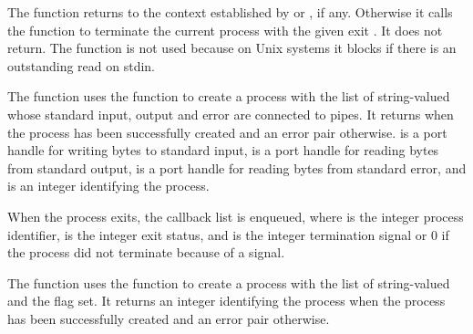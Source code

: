 \begin{function}
\end{function}

The  function returns  to the context
established by  or , if any.
Otherwise it calls the  function to terminate the current
process with the given exit . It does not return. The
 function is not used because on Unix systems it blocks if
there is an outstanding read on stdin.

\begin{function}
\end{function}

The  function uses the  function to
create a process with the list of string-valued  whose
standard input, output and error are connected to pipes.  It returns
 when the process has been successfully created and an
error pair otherwise.   is a port handle for writing
bytes to standard input,  is a port handle for
reading bytes from standard output,  is a port handle
for reading bytes from standard error, and  is an integer
identifying the process.

When the process exits, the callback list  is enqueued, where
 is the integer process identifier,  is the
integer exit status, and  is the integer termination
signal or 0 if the process did not terminate because of a signal.

\begin{function}
\end{function}

The  function uses the 
function to create a process with the list of string-valued 
and the  flag set. It returns an integer
identifying the process when the process has been successfully created
and an error pair otherwise.

\begin{function}
\end{function}

